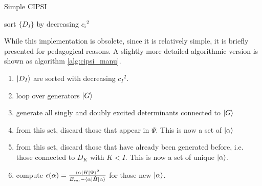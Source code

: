 \documentclass[./thesis.tex]{subfiles}
\begin{document}
\begin{algorithm}
        \caption{Simple CIPSI}
        \label{alg:cipsi_manu}
                \KwData{ $\ket \Psi$ }
                sort $\{D_I\}$ by decreasing ${c_i}^2$ \;
\end{algorithm}

While this implementation is obsolete, since it is relatively simple, it is briefly presented for pedagogical reasons. A slightly more detailed algorithmic version is shown as algorithm \ref{alg:cipsi_manu}.

\begin{enumerate}
\item
$\ket {D_I}$ are sorted with decreasing ${c_I}^2$.
\item
loop over generators $\ket G$
\item
generate all singly and doubly excited determinants connected to $\ket G$
\item
from this set, discard those that appear in $\Psi$. This is now a set of $\ket \alpha$
\item
from this set, discard those that have already been generated before, i.e. those connected to $D_K$ with $K<I$. This is now a set of unique $\ket \alpha$.
\item
compute $\epsilon(\alpha) = \frac{\langle \alpha|H|\Psi\rangle^2}{E_\text{var} - \mel{\alpha}{\hat{H}}{\alpha}}$ for those new $\ket \alpha$.
\end{enumerate}
\end{document}
